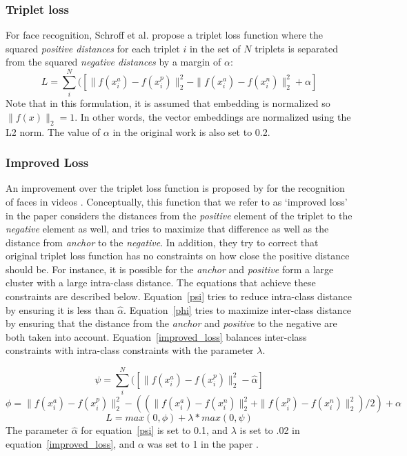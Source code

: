 \subsubsection{Triplet loss}
For face recognition, Schroff et al. \cite{DBLP:conf/cvpr/SchroffKP15} propose a triplet loss function where the squared \textit{positive distances} for each triplet $i$ in the set of $N$ triplets is separated from the squared \textit{negative distances} by a margin of $\alpha$:
\begin{equation}
  L = \sum_{i}^N(\left[\|f(x_i^a) - f(x_i^p)\|_{2}^2 - \|f(x_i^a)- f(x_i^n)\|_{2}^2 + \alpha \right]
\label{schroff}
\end{equation}
Note that in this formulation, it is assumed that embedding is normalized so $\| f(x) \|_2 = 1$.  In other words, the vector embeddings are normalized using the L2 norm.  The value of $\alpha$ in the original work \cite{DBLP:conf/cvpr/SchroffKP15} is also set to 0.2.

\subsubsection{Improved Loss}
 An improvement over the triplet loss function is proposed by \cite{DBLP:conf/cvpr/SchroffKP15} for the recognition of faces in videos \cite{Zhang:2016:DML:3088616.3088665}.  Conceptually, this function that we refer to as `improved loss' in the paper considers the distances from the \textit{positive} element of the triplet to the \textit{negative} element as well, and tries to maximize that difference as well as the distance from \textit{anchor} to the \textit{negative}.  In addition, they try to correct that  original triplet loss function has no constraints on how close the positive distance should be.  For instance, it is possible for the \textit{anchor} and \textit{positive} form a large cluster with a large intra-class distance. The equations that achieve these constraints are described below.  Equation~\ref{psi} tries to reduce intra-class distance by ensuring it is less than $\hat{\alpha}$.  Equation~\ref{phi} tries to maximize inter-class distance by ensuring that the distance from the \textit{anchor} and \textit{positive} to the negative are both taken into account.  Equation~\ref{improved_loss} balances inter-class constraints with intra-class constraints with the parameter $\lambda$.

\begin{equation}
  \psi = \sum_{i}^N(\left[\|f(x_i^a) - f(x_i^p)\|_{2}^2 - \hat{\alpha} \right]
\label{psi}
\end{equation}
\begin{equation}
  \phi = \|f(x_i^a) - f(x_i^p)\|_{2}^2 - \left( (\|f(x_i^a)- f(x_i^n)\|_{2}^2 + \|f(x_i^p) - f(x_i^n)\|_{2}^2) / 2 \right) + \alpha
\label{phi}
\end{equation}
\begin{equation}
  L = max(0, \phi) + \lambda * max(0, \psi)
\label{improved_loss}
\end{equation}
The parameter $\hat{\alpha}$ for equation~\ref{psi} is set to 0.1, and $\lambda$ is set to .02 in equation~\ref{improved_loss}, and $\alpha$ was set to 1 in the paper \cite{Zhang:2016:DML:3088616.3088665}.

